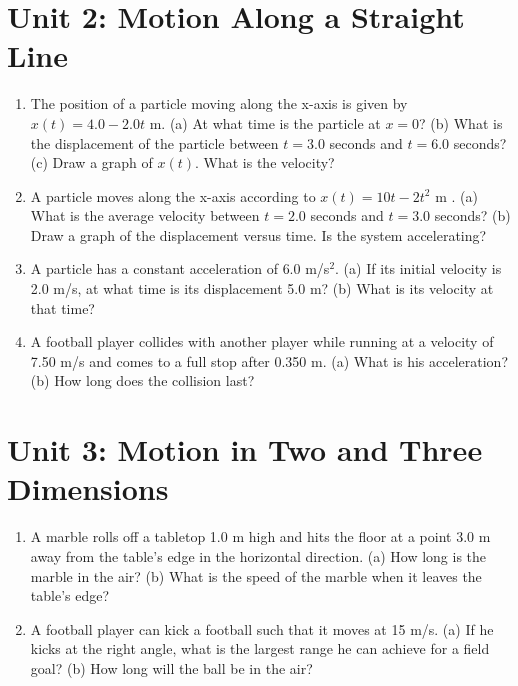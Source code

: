 \documentclass[10pt]{article}
\begin{document}
\section{Unit 2: Motion Along a Straight Line}

\begin{enumerate}
\item The position of a particle moving along the x-axis is given by $x(t) = 4.0 - 2.0t$ m. (a) At what time is the particle at $x=0$? (b) What is the displacement of the particle between $t=3.0$ seconds and $t=6.0$ seconds?  (c) Draw a graph of $x(t)$.  What is the velocity? \\ \vspace{2cm}
\item A particle moves along the x-axis according to $x(t) = 10t - 2t^2$ m . (a) What is the average velocity between $t=2.0$ seconds and $t=3.0$ seconds? (b) Draw a graph of the displacement versus time.  Is the system accelerating?  \\ \vspace{3cm}
\item A particle has a constant acceleration of $6.0$ m/s$^2$.  (a) If its initial velocity is 2.0 m/s, at what time is its displacement 5.0 m? (b) What is its velocity at that time? \\ \vspace{2cm}
\item A football player collides with another player while running at a velocity of 7.50 m/s and comes to a full stop after 0.350 m. (a) What is his acceleration? (b) How long does
the collision last? \\ \vspace{3cm}
\end{enumerate}

\section{Unit 3: Motion in Two and Three Dimensions}

\begin{enumerate}
\item A marble rolls off a tabletop 1.0 m high and hits the floor at a point 3.0 m away from the table’s edge in the horizontal direction. (a) How long is the marble in the air? (b) What is the speed of the marble when it leaves the table’s edge? \\ \vspace{1.5cm}
\item A football player can kick a football such that it moves at 15 m/s.  (a) If he kicks at the right angle, what is the largest range he can achieve for a field goal? (b) How long will the ball be in the air? \\ \vspace{0.75cm}
\end{enumerate}
\end{document}
